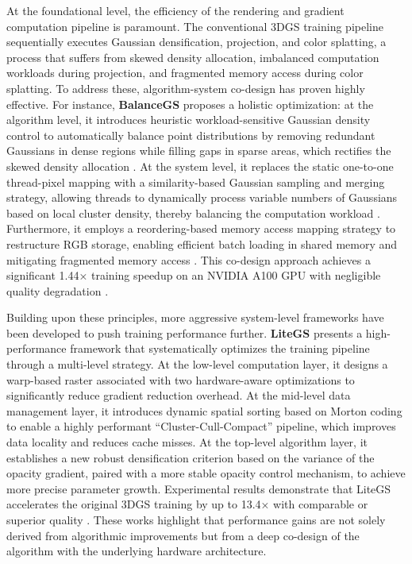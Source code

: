 \documentclass[11pt]{article}
\begin{document}
At the foundational level, the efficiency of the rendering and gradient computation pipeline is paramount. The conventional 3DGS training pipeline sequentially executes Gaussian densification, projection, and color splatting, a process that suffers from skewed density allocation, imbalanced computation workloads during projection, and fragmented memory access during color splatting. To address these, algorithm-system co-design has proven highly effective. For instance, \textbf{BalanceGS} proposes a holistic optimization: at the algorithm level, it introduces heuristic workload-sensitive Gaussian density control to automatically balance point distributions by removing redundant Gaussians in dense regions while filling gaps in sparse areas, which rectifies the skewed density allocation \cite{ref465}. At the system level, it replaces the static one-to-one thread-pixel mapping with a similarity-based Gaussian sampling and merging strategy, allowing threads to dynamically process variable numbers of Gaussians based on local cluster density, thereby balancing the computation workload \cite{ref465}. Furthermore, it employs a reordering-based memory access mapping strategy to restructure RGB storage, enabling efficient batch loading in shared memory and mitigating fragmented memory access \cite{ref465}. This co-design approach achieves a significant 1.44× training speedup on an NVIDIA A100 GPU with negligible quality degradation \cite{ref465}.

Building upon these principles, more aggressive system-level frameworks have been developed to push training performance further. \textbf{LiteGS} presents a high-performance framework that systematically optimizes the training pipeline through a multi-level strategy. At the low-level computation layer, it designs a warp-based raster associated with two hardware-aware optimizations to significantly reduce gradient reduction overhead. At the mid-level data management layer, it introduces dynamic spatial sorting based on Morton coding to enable a highly performant ``Cluster-Cull-Compact'' pipeline, which improves data locality and reduces cache misses. At the top-level algorithm layer, it establishes a new robust densification criterion based on the variance of the opacity gradient, paired with a more stable opacity control mechanism, to achieve more precise parameter growth. Experimental results demonstrate that LiteGS accelerates the original 3DGS training by up to 13.4× with comparable or superior quality \cite{ref466}. These works highlight that performance gains are not solely derived from algorithmic improvements but from a deep co-design of the algorithm with the underlying hardware architecture.
\end{document}
